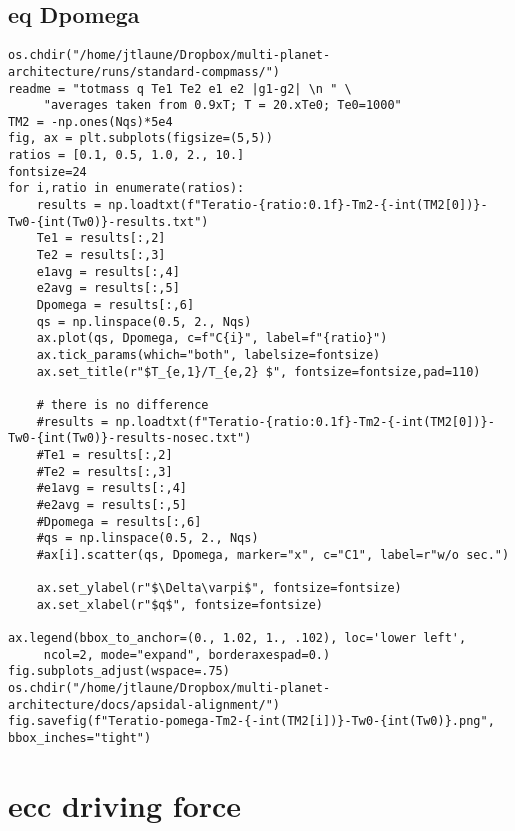 \documentclass[11pt]{article}
\begin{document}
\subsection{eq Dpomega}
\label{sec:orgd354305}
\begin{verbatim}
os.chdir("/home/jtlaune/Dropbox/multi-planet-architecture/runs/standard-compmass/")
readme = "totmass q Te1 Te2 e1 e2 |g1-g2| \n " \
	 "averages taken from 0.9xT; T = 20.xTe0; Te0=1000"
TM2 = -np.ones(Nqs)*5e4
fig, ax = plt.subplots(figsize=(5,5))
ratios = [0.1, 0.5, 1.0, 2., 10.]
fontsize=24
for i,ratio in enumerate(ratios):
    results = np.loadtxt(f"Teratio-{ratio:0.1f}-Tm2-{-int(TM2[0])}-Tw0-{int(Tw0)}-results.txt")
    Te1 = results[:,2]
    Te2 = results[:,3]
    e1avg = results[:,4]
    e2avg = results[:,5]
    Dpomega = results[:,6]
    qs = np.linspace(0.5, 2., Nqs)
    ax.plot(qs, Dpomega, c=f"C{i}", label=f"{ratio}")
    ax.tick_params(which="both", labelsize=fontsize)
    ax.set_title(r"$T_{e,1}/T_{e,2} $", fontsize=fontsize,pad=110)

    # there is no difference
    #results = np.loadtxt(f"Teratio-{ratio:0.1f}-Tm2-{-int(TM2[0])}-Tw0-{int(Tw0)}-results-nosec.txt")
    #Te1 = results[:,2]
    #Te2 = results[:,3]
    #e1avg = results[:,4]
    #e2avg = results[:,5]
    #Dpomega = results[:,6]
    #qs = np.linspace(0.5, 2., Nqs)
    #ax[i].scatter(qs, Dpomega, marker="x", c="C1", label=r"w/o sec.")

    ax.set_ylabel(r"$\Delta\varpi$", fontsize=fontsize)
    ax.set_xlabel(r"$q$", fontsize=fontsize)

ax.legend(bbox_to_anchor=(0., 1.02, 1., .102), loc='lower left',
	 ncol=2, mode="expand", borderaxespad=0.)
fig.subplots_adjust(wspace=.75)
os.chdir("/home/jtlaune/Dropbox/multi-planet-architecture/docs/apsidal-alignment/")
fig.savefig(f"Teratio-pomega-Tm2-{-int(TM2[i])}-Tw0-{int(Tw0)}.png", bbox_inches="tight")
\end{verbatim}

\section{ecc driving force}
\label{sec:org6da2680}
\end{document}
